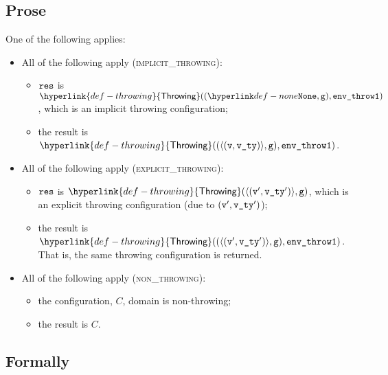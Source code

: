 \documentclass{book}
\newcommand\rethrowimplicit[0]{\hyperlink{def-rethrowimplicit}{\texttt{rethrow\_implicit}}}
\newcommand\valuereadfrom[0]{\hyperlink{def-valuereadfrom}{\textsf{value\_read\_from}}}
\newcommand\Throwing[0]{\hyperlink{def-throwing}{\textsf{Throwing}}}
\newcommand\vg[0]{\texttt{g}}
\newcommand\envthrowone[0]{\texttt{env\_throw1}}
\newcommand\vvty[0]{\texttt{v\_ty}}
\newcommand\eid[0]{\texttt{e\_id}}
\begin{document}
\subsection{Prose}
One of the following applies:
\begin{itemize}
  \item All of the following apply (\textsc{implicit\_throwing}):
  \begin{itemize}
    \item $\texttt{res}$ is $\Throwing((\None, \vg), \envthrowone)$, which is an implicit throwing configuration;
    \item the result is $\Throwing((\langle(\vv, \vvty)\rangle, \vg), \envthrowone)$.
  \end{itemize}

  \item All of the following apply (\textsc{explicit\_throwing}):
  \begin{itemize}
    \item $\texttt{res}$ is $\Throwing(\langle(\vv', \vvty')\rangle, \vg)$, which is an explicit throwing configuration
    (due to $(\vv', \vvty')$);
    \item the result is $\Throwing((\langle(\vv', \vvty')\rangle, \vg), \envthrowone)$. \\
    That is, the same throwing configuration is returned.
  \end{itemize}

  \item All of the following apply (\textsc{non\_throwing}):
  \begin{itemize}
    \item the configuration, $C$, domain is non-throwing;
    \item the result is $C$.
  \end{itemize}
\end{itemize}



\begin{emptyformal}
\subsection{Formally}
\end{emptyformal}
\end{document}
